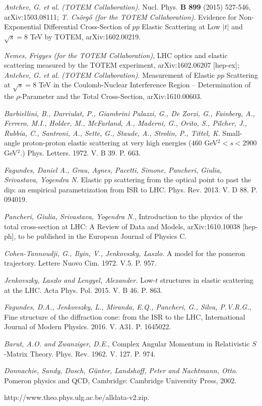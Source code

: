 \documentclass[aps,prd,superscriptaddress,showpacs,preprintnumbers]{revtex4}
\begin{document}
    \begin{thebibliography}{99}
 {\it Antchev, G. et al. (TOTEM Collaboration).} Nucl. Phys. {\bf B 899} (2015) 527-546, arXiv:1503.08111; {\it T. Cs\"org\H o (for the TOTEM Collaboration)}. Evidence for Non-Exponential Differential Cross-Section of $pp$ Elastic Scattering at Low $|t|$ and $\sqrt{s} = 8$ TeV by TOTEM, arXiv:1602.00219.

 {\it Nemes, Frigyes (for the TOTEM Collaboration)}, LHC optics and elastic scattering measured by the TOTEM experiment, arXiv:1602.06207 [hep-ex]; {\it Antchev, G. et al. (TOTEM Collaboration).} Measurement of Elastic $pp$ Scattering at $\sqrt{s} = 8$ TeV in the Coulomb-Nuclear Interference Region – Determination of the $\rho$-Parameter and the Total Cross-Section, arXiv:1610.00603. 

 {\it Barbiellini, B., Darriulat, P., Giambrini Palazzi, G., De Zorzi, G., Fainberg, A.,
	Ferrero, M.I., Holder, M., McFarland, A., Maderni, G., Orito, S., Pilcher, J., Rubbia, C., Santroni, A., Sette, G., Staude, A., Strolin, P., Tittel, K.} Small-angle proton-proton elastic scattering at very high energies ($460$ GeV$^2<s<2900$ GeV$^2$.) Phys. Letters. 1972. V. B 39. P. 663.

 {\it Fagundes, Daniel A., Grau, Agnes, Pacetti, Simone, Pancheri, Giulia, Srivastava, Yogendra N.} Elastic pp scattering from the optical point to past the dip: an empirical parametrization from ISR to LHC. Phys. Rev. 2013. V. D 88. P. 094019.

 {\it Pancheri, Giulia, Srivastava, Yogendra N.},
Introduction to the physics of the total cross-section at LHC: A Review of Data and Models, arXiv:1610.10038 [hep-ph], to be published in the European Journal of Physics C.

  {\it Cohen-Tannoudji, G., Ilyin, V., Jenkovszky, Laszlo.} A model for the pomeron trajectory. Lettere Nuovo Cim. 1972. V.5. P. 957.

 {\it Jenkovszky, Laszlo and Lengyel, Alexander.} Low-$t$ structures in elastic scattering at the LHC. Acta Phys. Pol. 2015. V. B 46. P. 863.

 {\it Fagundes, D.A., Jenkovszky, L., Miranda, E.Q., Pancheri, G., Silva, P.V.R.G.},
Fine structure of the diffraction cone: from the ISR to the LHC, International Journal of Modern Physics. 2016. V. A31. P. 1645022.

 {\it Barut, A.O. and Zwanziger, D.E.}, Complex Angular Momentum in Relativistic $S$-Matrix Theory. Phys. Rev. 1962. V. 127. P. 974.

 {\it Donnachie, Sandy, Dosch, G\"unter,
	Landshoff, Peter and Nachtmann, Otto}. Pomeron physics and QCD, Cambridge:
Cambridge University Press, 2002.

 http://www.theo.phys.ulg.ac.be/alldata-v2.zip.

\end{thebibliography}

\end{document}
